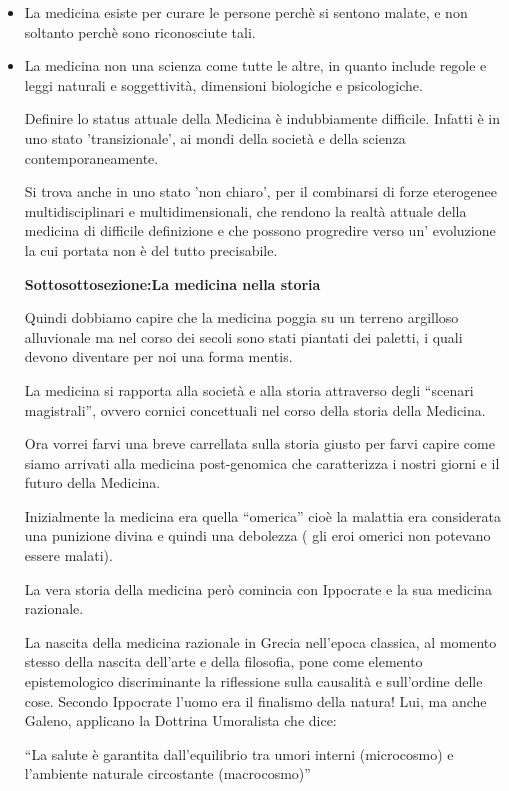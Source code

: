 \documentclass[]{article}
\begin{document}
\begin{itemize}
\item
  La medicina esiste per curare le persone perchè si sentono malate, e
  non soltanto perchè sono riconosciute tali.
\item
  La medicina non una scienza come tutte le altre, in quanto include
  regole e leggi naturali e soggettività, dimensioni biologiche e
  psicologiche.

  Definire lo status attuale della Medicina è indubbiamente difficile.
  Infatti è in uno stato 'transizionale', ai mondi della società e della
  scienza contemporaneamente.

  Si trova anche in uno stato 'non chiaro', per il combinarsi di forze
  eterogenee multidisciplinari e multidimensionali, che rendono la
  realtà attuale della medicina di difficile definizione e che possono
  progredire verso un' evoluzione la cui portata non è del tutto
  precisabile.

  \textbf{Sottosottosezione:La medicina nella storia }

  Quindi dobbiamo capire che la medicina poggia su un terreno argilloso
  alluvionale ma nel corso dei secoli sono stati piantati dei paletti, i
  quali devono diventare per noi una forma mentis.

  La medicina si rapporta alla società e alla storia attraverso degli
  ``scenari magistrali'', ovvero cornici concettuali nel corso della
  storia della Medicina.

  Ora vorrei farvi una breve carrellata sulla storia giusto per farvi
  capire come siamo arrivati alla medicina post-genomica che
  caratterizza i nostri giorni e il futuro della Medicina.

  Inizialmente la medicina era quella ``omerica'' cioè la malattia era
  considerata una punizione divina e quindi una debolezza ( gli eroi
  omerici non potevano essere malati).

  La vera storia della medicina però comincia con Ippocrate e la sua
  medicina razionale.

  La nascita della medicina razionale in Grecia nell'epoca classica, al
  momento stesso della nascita dell'arte e della filosofia, pone come
  elemento epistemologico discriminante la riflessione sulla causalità e
  sull'ordine delle cose. Secondo Ippocrate l'uomo era il finalismo
  della natura! Lui, ma anche Galeno, applicano la Dottrina Umoralista
  che dice:

  ``La salute è garantita dall'equilibrio tra umori interni (microcosmo)
  e l'ambiente naturale circostante (macrocosmo)''


\end{itemize}
\end{document}
